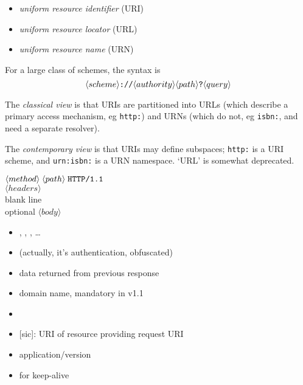 \documentclass{sepslide-soa-faked} %
\begin{document}
\begin{slide}
\begin{itemize}
\item \emph{uniform resource identifier} (URI)
\item \emph{uniform resource locator} (URL)
\item \emph{uniform resource name} (URN)
\end{itemize}
For a large class of schemes, the syntax is
$$
\langle scheme \rangle 
\verb"://"
\langle authority \rangle
\langle path \rangle
\verb"?"
\langle query \rangle
$$

The \emph{classical view} is that URIs are partitioned into URLs (which describe a primary access mechanism, eg \verb"http:") and URNs (which do not, eg \verb"isbn:", and need a separate resolver).

The \emph{contemporary view} is that URIs may define subspaces; \verb"http:" is a URI scheme, and \verb"urn:isbn:" is a URN namespace. `URL' is somewhat deprecated. 
\end{slide}

\begin{slide}
$ \langle method \rangle \; \langle path \rangle \; \verb"HTTP/1.1" $ \\
$ \langle headers \rangle $ \\
blank line \\
optional $ \langle body \rangle $
\begin{itemize}
\item {}, , , \ldots
\item {} (actually, it's authentication, obfuscated)
\item {} data returned from previous response
\item {} domain name, mandatory in v1.1
\item {}
\item {} [sic]: URI of resource providing request URI
\item {} application/version
\item {} for keep-alive
\end{itemize}
\end{slide}
\end{document}
